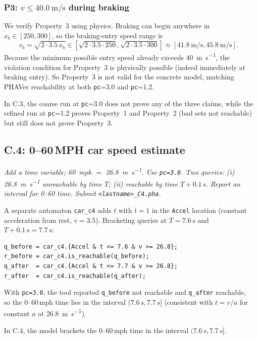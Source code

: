 \documentclass[10pt]{article}
\newcommand{\afterprompt}{\par\medskip}
\begin{document}
\subsubsection*{P3: $v \leq \SI{40.0}{\meter\per\second}$ during braking}
We verify Property~3 using physics. Braking can begin anywhere in $x_b\in[250,300]$, so the braking-entry speed range is
\[
v_b=\sqrt{2\cdot 3.5\,x_b}\in
\left[\sqrt{2\cdot 3.5\cdot 250},\sqrt{2\cdot 3.5\cdot 300}\right]
\approx [\SI{41.8}{\meter\per\second},\SI{45.8}{\meter\per\second}].
\]
Because the minimum possible entry speed already exceeds \SI{40}{\meter\per\second}, the violation condition for Property~3 is physically possible (indeed immediately at braking entry). So Property~3 is not valid for the concrete model, matching PHAVer reachability at both \texttt{pc}=3.0 and \texttt{pc}=1.2.

\noindent In C.3, the coarse run at \texttt{pc}=3.0 does not prove any of the three claims, while the refined run at \texttt{pc}=1.2 proves Property~1 and Property~2 (bad sets not reachable) but still does not prove Property~3.

\subsection*{C.4: 0--60\,MPH car speed estimate}
\textit{Add a time variable; \SI{60}{mph} \(=\) \SI{26.8}{\meter\per\second}. Use \texttt{pc=3.0}. Two queries: (i) \SI{26.8}{\meter\per\second} unreachable by time $T$; (ii) reachable by time $T+\SI{0.1}{\second}$. Report an interval for 0--60 time. Submit \texttt{<lastname>\_C4.pha}.}
\afterprompt
A separate automaton \texttt{car\_c4} adds $t$ with $\dot{t}=1$ in the \texttt{Accel} location (constant acceleration from rest, $\dot{v}=3.5$). Bracketing queries at $T=\SI{7.6}{\second}$ and $T+\SI{0.1}{\second}=\SI{7.7}{\second}$:
\begin{lstlisting}[style=phaver]
q_before = car_c4.{Accel & t <= 7.6 & v >= 26.8};
r_before = car_c4.is_reachable(q_before);
q_after  = car_c4.{Accel & t <= 7.7 & v >= 26.8};
r_after  = car_c4.is_reachable(q_after);
\end{lstlisting}
With \texttt{pc=3.0}, the tool reported \texttt{q\_before} not reachable and \texttt{q\_after} reachable, so the 0--60\,mph time lies in the interval \textbf{$(\SI{7.6}{\second},\SI{7.7}{\second}]$} (consistent with $t=v/a$ for constant $a$ at \SI{26.8}{\meter\per\second}).

\noindent In C.4, the model brackets the 0--60\,mph time in the interval \textbf{$(\SI{7.6}{\second},\SI{7.7}{\second}]$}.
\end{document}
